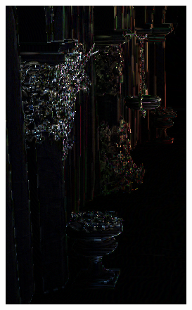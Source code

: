 \begin{figure}[htb]
\begin{subfigure}[b]{0.20\textwidth}
        \includegraphics[width=.95\textwidth]{screenshots/interleaved_difference_gi}
        \caption{}
        \label{fig:results:interleaved_difference_gi}
    \end{subfigure}
    \begin{subfigure}[b]{0.32\textwidth}
        \centering

\end{subfigure}
\end{figure}

